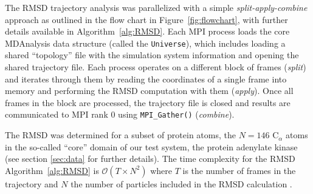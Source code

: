 The RMSD trajectory analysis was parallelized with a simple \emph{split-apply-combine} approach \cite{Wickham:2011aa} as outlined in the flow chart in Figure~\ref{fig:flowchart}, with further details available in Algorithm~\ref{alg:RMSD}.
Each MPI process loads the core MDAnalysis data structure (called the \texttt{Universe}), which includes loading a shared ``topology'' file with the simulation system information and opening the shared trajectory file.
Each process operates on a different block of frames (\emph{split}) and iterates through them by reading the coordinates of a single frame into memory and performing the RMSD computation with them (\emph{apply}).
Once all frames in the block are processed, the trajectory file is closed and results are communicated to MPI rank 0 using \texttt{MPI\_Gather()} (\emph{combine}).

The RMSD was determined for a subset of protein atoms, the $N=146$  C$_{\alpha}$ atoms in the so-called ``core'' domain of our test system, the protein adenylate kinase \cite{Seyler:2014il} (see section \ref{sec:data} for further details).
The time complexity for the RMSD Algorithm~\ref{alg:RMSD} is $\mathcal{O}(T \times N^{2})$ where $T$ is the number of frames in the trajectory and $N$ the number of particles included in the RMSD calculation \cite{Liu:2010kx}.

